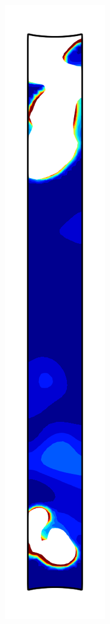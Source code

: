\begin{figure}[!htb]
  \centering
  \begin{subfigure}{0.08\textwidth}
    \centering
    \includegraphics[width=\textwidth]{Chapter5/figures/spallation/psii_1}

\end{subfigure}
\end{figure}
